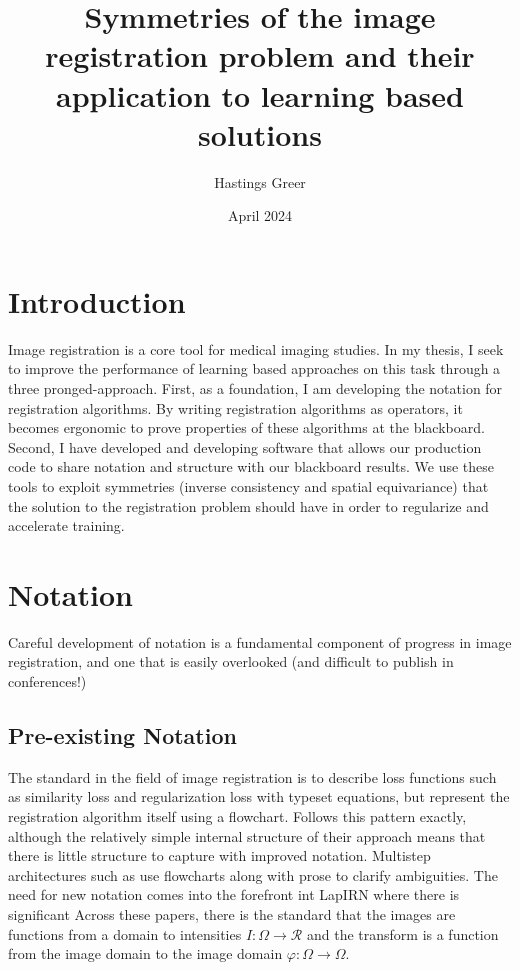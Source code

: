 \documentclass{article}
\title{Symmetries of the image registration problem and their application to learning based solutions}
\author{Hastings Greer }
\date{April 2024}
\begin{document}
\maketitle

\section{Introduction}

Image registration is a core tool for medical imaging studies. In my thesis, I seek to improve the performance of learning based approaches on this task through a three pronged-approach. First, as a foundation, I am developing the notation for registration algorithms. By writing registration algorithms as operators, it becomes ergonomic to prove properties of these algorithms at the blackboard. Second, I have developed and developing software that allows our production code to share notation and structure with our blackboard results. We use these tools to exploit symmetries (inverse consistency and spatial equivariance) that the solution to the registration problem should have in order to regularize and accelerate training.



\section{Notation}

Careful development of notation is a fundamental component of progress in image registration, and one that is easily overlooked (and difficult to publish in conferences!) 

\subsection{Pre-existing Notation}
The standard in the field of image registration is to describe loss functions such as similarity loss and regularization loss with typeset equations, but represent the registration algorithm itself using a flowchart. \cite{balakrishnan2019voxelmorph} Follows this pattern exactly, although the relatively simple internal structure of their approach means that there is little structure to capture with improved notation. Multistep architectures such as \cite{shen2019networks, mok2020large} use flowcharts along with prose to clarify ambiguities. The need for new notation comes into the forefront int LapIRN \cite{mok2020large} where there is significant 
Across these papers, there is the standard that the images are functions from a domain to intensities $I: \Omega \rightarrow \mathcal{R}$ and the transform is a function from the image domain to the image domain $\varphi: \Omega \rightarrow \Omega$.
\end{document}
